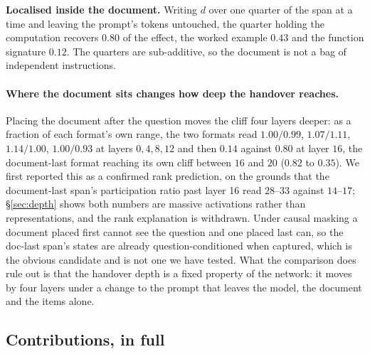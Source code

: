 \documentclass{article}
\newcommand{\dvec}{\ensuremath{d}}
\begin{document}
\textbf{Localised inside the document.} Writing $\dvec$ over one quarter of the
span at a time and leaving the prompt's tokens untouched, the quarter holding
the computation recovers $0.80$ of the effect, the worked example $0.43$ and the
function signature $0.12$. The quarters are sub-additive, so the document is not
a bag of independent instructions.

\paragraph{Where the document sits changes how deep the handover reaches.}
Placing the document after the question moves the cliff four layers deeper: as a
fraction of each format's own range, the two formats read $1.00/0.99$,
$1.07/1.11$, $1.14/1.00$, $1.00/0.93$ at layers $0, 4, 8, 12$ and then
$\mathbf{0.14}$ against $\mathbf{0.80}$ at layer $16$, the document-last format
reaching its own cliff between $16$ and $20$ ($0.82$ to $0.35$). We first
reported this as a confirmed rank prediction, on the grounds that the
document-last span's participation ratio past layer 16 read $28$--$33$ against
$14$--$17$; \S\ref{sec:depth} shows both numbers are massive activations rather
than representations, and the rank explanation is withdrawn. Under causal
masking a document placed first cannot see the question and one placed last can,
so the doc-last span's states are already question-conditioned when captured,
which is the obvious candidate and is not one we have tested. What the
comparison does rule out is that the handover depth is a fixed property of the
network: it moves by four layers under a change to the prompt that leaves the
model, the document and the items alone.




\subsection{Contributions, in full}
\label{app:contrib}
\end{document}
